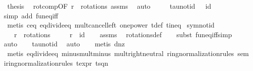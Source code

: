 \begin{isabellebody}
\ {\isacharquery}thesis\ \isamarkupfalse%
\ rot{\isacharunderscore}comp{\isacharbrackleft}OF\ {\isacartoucheopen}r{\isacharprime}{\isacharprime}\ {\isasymin}\ rotations{\isacartoucheclose}\ assms{\isacharparenleft}{}{\isacharparenright}{\isacharbrackright}\ \isamarkupfalse%
\ auto\ \ \ \ \isanewline
{}\isamarkupfalse%
%
\endisatagproof
{\isafoldproof}%
%
\isadelimproof
\isanewline
%
\endisadelimproof
\isanewline
{}\isamarkupfalse%
\ tau{\isacharunderscore}not{\isacharunderscore}id{\isacharcolon}\ {\isachardoublequoteopen}{\isasymtau}\ {\isasymnoteq}\ id{\isachardoublequoteclose}\isanewline
%
\isadelimproof
\ \ %
\endisadelimproof
%
\isatagproof
{}\isamarkupfalse%
{\isacharparenleft}simp\ add{\isacharcolon}\ fun{\isacharunderscore}eq{\isacharunderscore}iff{\isacharparenright}\ \isanewline
\ \ \isamarkupfalse%
\ {\isacharparenleft}metis\ c{\isacharunderscore}eq{\isacharunderscore}{}\ eq{\isacharunderscore}divide{\isacharunderscore}eq{\isacharunderscore}{}\ mult{\isacharunderscore}cancel{\isacharunderscore}left{}\ one{\isacharunderscore}power{}\ t{\isacharunderscore}def\ t{\isacharunderscore}ineq{\isacharparenleft}{}{\isacharparenright}{\isacharparenright}%
\endisatagproof
{\isafoldproof}%
%
\isadelimproof
\isanewline
%
\endisadelimproof
\isanewline
{}\isamarkupfalse%
\ sym{\isacharunderscore}not{\isacharunderscore}id{\isacharcolon}\isanewline
\ \ \ {\isachardoublequoteopen}r\ {\isasymin}\ rotations{\isachardoublequoteclose}\isanewline
\ \ \ {\isachardoublequoteopen}{\isasymtau}\ {\isasymcirc}\ r\ {\isasymnoteq}\ id{\isachardoublequoteclose}\isanewline
%
\isadelimproof
\ \ %
\endisadelimproof
%
\isatagproof
{}\isamarkupfalse%
\ assms\ \isamarkupfalse%
\ rotations{\isacharunderscore}def\ \isanewline
\ \ \isamarkupfalse%
{\isacharparenleft}subst\ fun{\isacharunderscore}eq{\isacharunderscore}iff{\isacharcomma}simp{\isacharparenright}\isanewline
\ \ \isamarkupfalse%
{\isacharparenleft}auto{\isacharparenright}\isanewline
\ \ \isamarkupfalse%
\ tau{\isacharunderscore}not{\isacharunderscore}id\ \isamarkupfalse%
\ auto{\isacharbrackleft}{}{\isacharbrackright}\isanewline
\ \ \isamarkupfalse%
\ {\isacharparenleft}metis\ d{\isacharunderscore}nz{\isacharparenright}\isanewline
\ \ \isamarkupfalse%
\ {\isacharparenleft}metis\ eq{\isacharunderscore}divide{\isacharunderscore}eq{\isacharunderscore}{}\ minus{\isacharunderscore}mult{\isacharunderscore}minus\ mult{\isachardot}right{\isacharunderscore}neutral\ ring{\isacharunderscore}normalization{\isacharunderscore}rules{\isacharparenleft}{}{\isacharparenright}\ semiring{\isacharunderscore}normalization{\isacharunderscore}rules{\isacharparenleft}{}{}{\isacharparenright}\ t{\isacharunderscore}expr{\isacharparenleft}{}{\isacharparenright}\ t{\isacharunderscore}sq{\isacharunderscore}n{}{\isacharparenright}\isanewline

\end{isabellebody}
